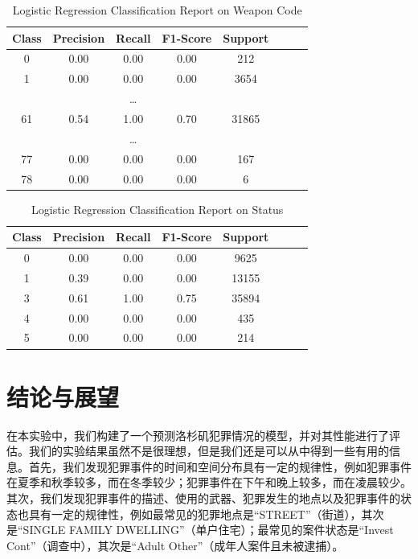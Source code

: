 \documentclass{article}
\begin{document}
\begin{table}[H]
    \centering
    \begin{tabular}{cccccccc}
        \toprule
        Class & Precision & Recall & F1-Score & Support \\
        \midrule
        0     & 0.00      & 0.00   & 0.00     & 212     \\
        1     & 0.00      & 0.00   & 0.00     & 3654    \\
              &           & \dots  &          &         \\
        61    & 0.54      & 1.00   & 0.70     & 31865   \\
              &           & \dots  &          &         \\
        77    & 0.00      & 0.00   & 0.00     & 167     \\
        78    & 0.00      & 0.00   & 0.00     & 6       \\
        \bottomrule
    \end{tabular}
    \caption{Logistic Regression Classification Report on Weapon Code}
    \label{tab:classification_report_weapon}
\end{table}

\begin{table}[H]
    \centering
    \begin{tabular}{cccccccc}
        \toprule
        Class & Precision & Recall & F1-Score & Support \\
        \midrule
        0     & 0.00      & 0.00   & 0.00     & 9625    \\
        1     & 0.39      & 0.00   & 0.00     & 13155   \\
        3     & 0.61      & 1.00   & 0.75     & 35894   \\
        4     & 0.00      & 0.00   & 0.00     & 435     \\
        5     & 0.00      & 0.00   & 0.00     & 214     \\
        \bottomrule
    \end{tabular}
    \caption{Logistic Regression Classification Report on Status}
    \label{tab:classification_report_status}
\end{table}

\section{结论与展望}
在本实验中，我们构建了一个预测洛杉矶犯罪情况的模型，并对其性能进行了评估。我们的实验结果虽然不是很理想，但是我们还是可以从中得到一些有用的信息。首先，我们发现犯罪事件的时间和空间分布具有一定的规律性，例如犯罪事件在夏季和秋季较多，而在冬季较少；犯罪事件在下午和晚上较多，而在凌晨较少。其次，我们发现犯罪事件的描述、使用的武器、犯罪发生的地点以及犯罪事件的状态也具有一定的规律性，例如最常见的犯罪地点是“STREET”（街道），其次是“SINGLE FAMILY DWELLING”（单户住宅）；最常见的案件状态是“Invest Cont”（调查中），其次是“Adult Other”（成年人案件且未被逮捕）。
\end{document}
